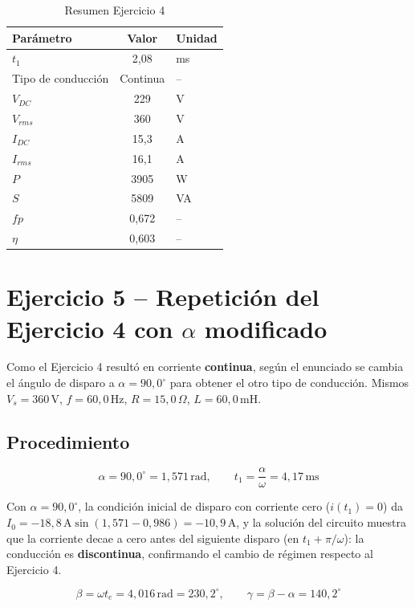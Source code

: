 \documentclass[12pt,a4paper]{article}
\begin{document}
\begin{table}[H]
\centering
\begin{tabular}{lcl}
\toprule
\textbf{Parámetro} & \textbf{Valor} & \textbf{Unidad}\\
\midrule
$t_1$ & 2{,}08 & ms\\
Tipo de conducción & Continua & --\\
$V_{DC}$ & 229 & V\\
$V_{rms}$ & 360 & V\\
$I_{DC}$ & 15{,}3 & A\\
$I_{rms}$ & 16{,}1 & A\\
$P$ & 3905 & W\\
$S$ & 5809 & VA\\
$fp$ & 0{,}672 & --\\
$\eta$ & 0{,}603 & --\\
\bottomrule
\end{tabular}
\caption{Resumen Ejercicio 4}
\end{table}

\newpage
\section{Ejercicio 5 -- Repetición del Ejercicio 4 con $\alpha$ modificado}

Como el Ejercicio 4 resultó en corriente \textbf{continua}, según el enunciado
se cambia el ángulo de disparo a $\alpha=90{,}0^\circ$ para obtener el otro tipo
de conducción. Mismos $V_s=360\,\text{V}$, $f=60{,}0\,\text{Hz}$,
$R=15{,}0\,\Omega$, $L=60{,}0\,\text{mH}$.

\subsection{Procedimiento}

\begin{equation}
    \alpha = 90{,}0^\circ = 1{,}571\,\text{rad}, \qquad t_1 = \frac{\alpha}{\omega} = \boxed{4{,}17\,\text{ms}}
\end{equation}

Con $\alpha=90{,}0^\circ$, la condición inicial de disparo con corriente cero
($i(t_1)=0$) da $I_0 = -18{,}8\,\text{A}\sin(1{,}571-0{,}986) = -10{,}9\,\text{A}$,
y la solución del circuito muestra que la corriente decae a cero antes del
siguiente disparo (en $t_1+\pi/\omega$): la conducción es \textbf{discontinua},
confirmando el cambio de régimen respecto al Ejercicio 4.

\begin{equation}
    \beta = \omega t_e = 4{,}016\,\text{rad} = \boxed{230{,}2^\circ}, \qquad
    \gamma = \beta - \alpha = \boxed{140{,}2^\circ}
\end{equation}
\end{document}
